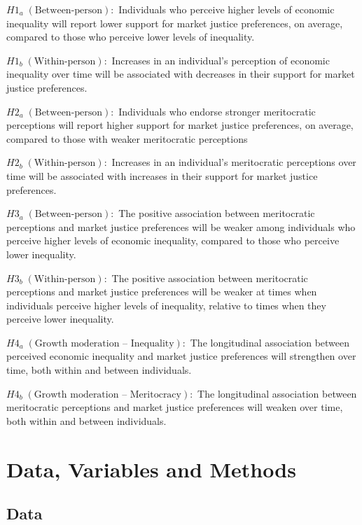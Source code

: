 \documentclass[
  12pt,
]{article}
\begin{document}
\(H1_{a} \; (\text{Between-person}):\) Individuals who perceive higher
levels of economic inequality will report lower support for market
justice preferences, on average, compared to those who perceive lower
levels of inequality.

\(H1_{b} \; (\text{Within-person}):\) Increases in an individual's
perception of economic inequality over time will be associated with
decreases in their support for market justice preferences.

\(H2_{a} \; (\text{Between-person}):\) Individuals who endorse stronger
meritocratic perceptions will report higher support for market justice
preferences, on average, compared to those with weaker meritocratic
perceptions

\(H2_{b} \; (\text{Within-person}):\) Increases in an individual's
meritocratic perceptions over time will be associated with increases in
their support for market justice preferences.

\(H3_{a} \; (\text{Between-person}):\) The positive association between
meritocratic perceptions and market justice preferences will be weaker
among individuals who perceive higher levels of economic inequality,
compared to those who perceive lower inequality.

\(H3_{b} \; (\text{Within-person}):\) The positive association between
meritocratic perceptions and market justice preferences will be weaker
at times when individuals perceive higher levels of inequality, relative
to times when they perceive lower inequality.

\(H4_{a} \; (\text{Growth moderation – Inequality}):\) The longitudinal
association between perceived economic inequality and market justice
preferences will strengthen over time, both within and between
individuals.

\(H4_{b} \; (\text{Growth moderation – Meritocracy}):\) The longitudinal
association between meritocratic perceptions and market justice
preferences will weaken over time, both within and between individuals.

\section{Data, Variables and Methods}\label{data-variables-and-methods}

\subsection{Data}\label{data}
\end{document}
